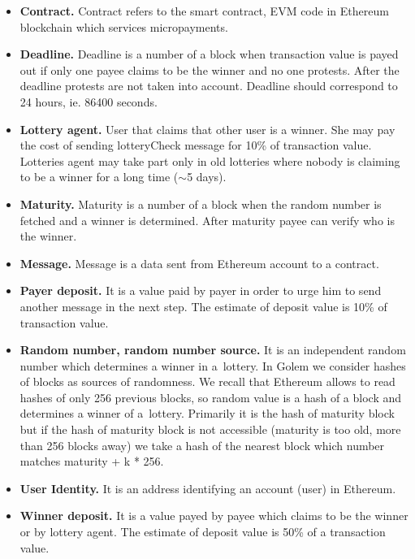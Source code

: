 \documentclass[a4paper]{article}
\begin{document}
    \begin{itemize}
        \item \textbf{Contract.} Contract refers to the smart contract, EVM code in Ethereum blockchain which
            services micropayments.
        \item \textbf{Deadline.} Deadline is a number of a block when transaction value is payed out if only one
            payee claims to be the winner and no one protests. After the deadline protests are not taken into
            account. Deadline should correspond to 24 hours, ie. 86400 seconds.
        \item \textbf{Lottery agent.} User that claims that other user is a winner. She may pay the cost of sending
            lotteryCheck message for 10\% of transaction value. Lotteries agent may take part only in old lotteries
            where nobody is claiming to be a winner for a long time ($\sim$5 days).
        \item \textbf{Maturity.} Maturity is a number of a block when the random number is fetched and a winner is
            determined. After maturity payee can verify who is the winner.
        \item \textbf{Message.} Message is a data sent from Ethereum account to a contract.
        \item \textbf{Payer deposit.} It is a value paid by payer in order to urge him to send another message in the
            next step. The estimate of deposit value is 10\% of transaction value.
        \item \textbf{Random number, random number source.} It is an independent random number which determines a
            winner in a~lottery. In Golem we consider hashes of blocks as sources of randomness. We recall that
            Ethereum allows to read hashes of only 256 previous blocks, so random value is a hash of a block and
            determines a winner of a~lottery. Primarily it is the hash of maturity block but if the hash of maturity
            block is not accessible (maturity is too old, more than 256 blocks away) we take a hash of the nearest
            block which number matches maturity + k * 256.
        \item \textbf{User Identity.} It is an address identifying an account (user) in Ethereum.
        \item \textbf{Winner deposit.} It is a value payed by payee which claims to be the winner or by lottery
            agent.  The estimate of deposit value is 50\% of a transaction value.
    \end{itemize}
\end{document}
